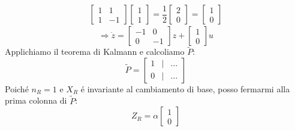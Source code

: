 \documentclass[../main.tex]{subfiles}
\begin{document}
\begin{mdframed}[style=Exercise]
\begin{Exercise}[title={Calcolo di $ X_R $ e decomposizione di raggiungibilit\'a}, difficulty=1]
\begin{align*}
					\begin{bmatrix}
						1 & 1\\
						1 & -1
					\end{bmatrix}
					\begin{bmatrix}
						1\\
						1
					\end{bmatrix} = \dfrac{1}{2}
					\begin{bmatrix}
						2\\
						0
					\end{bmatrix}=
					\begin{bmatrix}
						1\\
						0
					\end{bmatrix}
				\end{align*}
				\[
					\Rightarrow \dot z=
					\begin{bmatrix}
						-1 & 0\\
						0 & -1
					\end{bmatrix} z +
					\begin{bmatrix}
						1\\
						0
					\end{bmatrix} u
				\]
				Applichiamo il teorema di Kalmann e calcoliamo $ \tilde P $:
				\[
					\tilde P =
					\begin{bmatrix}
						1 & | & \dots\\
						0 & | & \dots
					\end{bmatrix}
				\]
				Poich\'e $ n_R = 1 $ e $ X_R $ \'e invariante al cambiamento di base, posso fermarmi alla prima colonna di $ \tilde P $:
				\[
					Z_R = \alpha
					\begin{bmatrix}
						1\\
						0
					\end{bmatrix}
				\]
			\end{Exercise}
		\end{mdframed}
	
\end{document}
